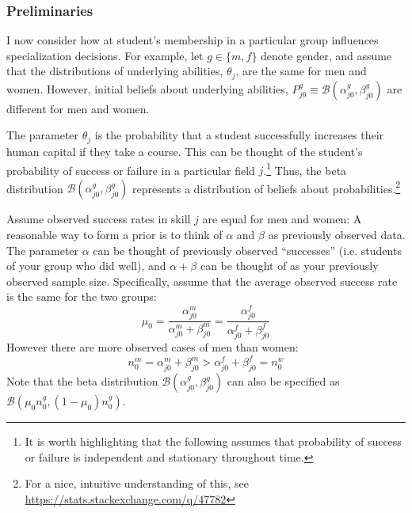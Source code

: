 \documentclass[10 pt]{article}
\newcommand{\pr}[1]{\left( #1 \right)}
\begin{document}
\subsubsection{Preliminaries}

\begin{blist}



\item I now consider how at student's membership in a particular group influences specialization decisions. 
For example, let $g \in \{ m, f \}$ denote gender,  
and assume that the distributions of underlying abilities, $\theta_j$, are the same for men and women.
However, initial beliefs about underlying abilities, $P_{j0}^g \equiv \mathcal{B} \pr{\alpha_{j0}^g, \beta_{j0}^g}$ are different for men and women. 

\item The parameter $\theta_j$ is the probability that a student successfully increases their human capital if they take a course. 
This can be thought of the student's probability of success or failure in a particular field $j$.\footnote{
   It is worth highlighting that the following assumes that probability of success or failure is independent and stationary throughout time.}
Thus, the beta distribution $\mathcal{B} \pr{\alpha_{j0}^g, \beta_{j0}^g}$ represents a distribution of beliefs about probabilities.\footnote{For a nice, intuitive understanding of this, see \url{https://stats.stackexchange.com/q/47782}} 

\item 
Assume observed success rates in skill $j$ are equal for men and women:
A reasonable way to form a prior is to think of $\alpha$ and $\beta$ as previously observed data. The parameter $\alpha$ can be thought of previously observed ``successes'' (i.e. students of your group who did well), and $\alpha + \beta$ can be thought of as your previously observed sample size. 
Specifically, assume that the average observed success rate is the same for the two groups:
\begin{equation*}
\mu_0 = 
	\frac{\alpha_{j0}^m}{\alpha_{j0}^m + \beta_{j0}^m} = 
	\frac{\alpha_{j0}^f}{\alpha_{j0}^f + \beta_{j0}^f}
\end{equation*}
However there are more observed cases of men than women:
\begin{equation*}
	n_0^m = \alpha_{j0}^m + \beta_{j0}^m > \alpha_{j0}^f + \beta_{j0}^f = n_0^w
\end{equation*}
Note that the beta distribution $\mathcal{B} \pr{\alpha_{j0}^g, \beta_{j0}^g}$ can also be specified as $\mathcal{B} \pr{\mu_0 n_0^g, (1 - \mu_0) n_0^g}$.


\end{blist}
\end{document}
